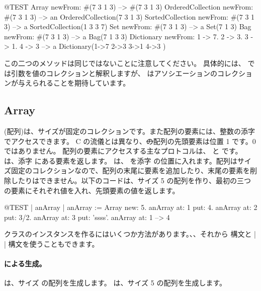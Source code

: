 \documentclass[a4paper,10pt,twoside]{book}
\begin{document}
\begin{code}{@TEST}
Array newFrom: #(7 3 1 3)                                          --> #(7 3 1 3)
OrderedCollection newFrom: #(7 3 1 3)                     --> an OrderedCollection(7 3 1 3)
SortedCollection newFrom: #(7 3 1 3)                       --> a SortedCollection(1 3 3 7)
Set newFrom: #(7 3 1 3)                                            --> a Set(7 1 3)
Bag newFrom: #(7 3 1 3)                                           --> a Bag(7 1 3 3)
Dictionary newFrom: {1 -> 7. 2 -> 3. 3 -> 1. 4 -> 3} --> a Dictionary(1->7 2->3 3->1 4->3 )
\end{code}
\noindent
この二つのメソッドは同じではないことに注意してください。
具体的には、 では引数を値のコレクションと解釈しますが、 はアソシエーションのコレクションが与えられることを期待しています。

\subsection{Array}
 (配列)は、サイズが固定のコレクションです。また配列の要素には、整数の添字でアクセスできます。
C の流儀とは異なり、\st の配列の先頭要素は位置 1 です。0 ではありません。
配列の要素にアクセスする主なプロトコルは、 と  です。 は、添字  にある要素を返します。 は、 を添字  の位置に入れます。配列はサイズ固定のコレクションなので、配列の末尾に要素を追加したり、末尾の要素を削除したりはできません。以下のコードは、サイズ 5 の配列を作り、最初の三つの要素にそれぞれ値を入れ、先頭要素の値を返します。

\begin{code}{@TEST | anArray | }
anArray := Array new: 5.
anArray at: 1 put: 4.
anArray at: 2 put: 3/2.
anArray at: 3 put: 'ssss'.
anArray at: 1 --> 4
\end{code}

 クラスのインスタンスを作るにはいくつか方法があります。、、それから \ct{#( )} 構文と \ct|{ }| 構文を使うこともできます。%

\paragraph{ による生成。}  は、サイズ  の配列を生成します。
 は、サイズ 5 の配列を生成します。
\end{document}
